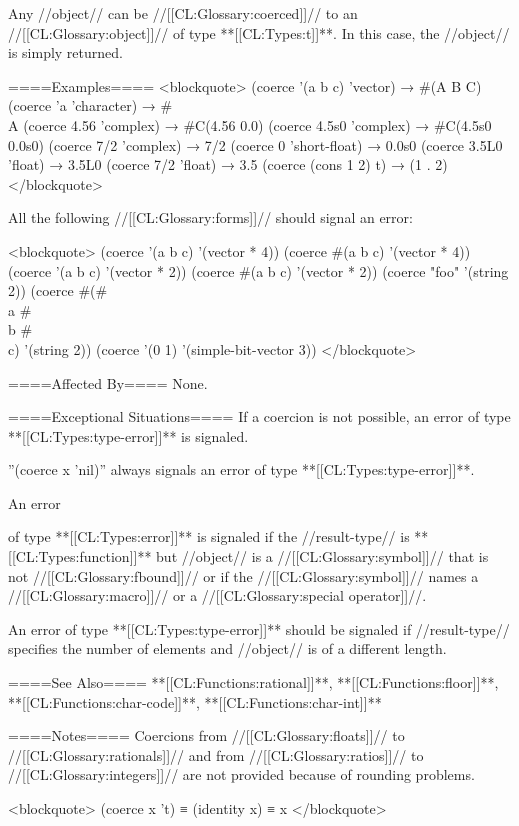 \itemitem{**[[CL:Types:t]]**}

Any //object// can be //[[CL:Glossary:coerced]]// to an //[[CL:Glossary:object]]// of type **[[CL:Types:t]]**. In this case, the //object// is simply returned.

\endlist

====Examples====
<blockquote> (coerce '(a b c) 'vector) → #(A B C) (coerce 'a 'character) → #\\A (coerce 4.56 'complex) → #C(4.56 0.0) (coerce 4.5s0 'complex) → #C(4.5s0 0.0s0) (coerce 7/2 'complex) → 7/2 (coerce 0 'short-float) → 0.0s0 (coerce 3.5L0 'float) → 3.5L0 (coerce 7/2 'float) → 3.5 (coerce (cons 1 2) t) → (1 . 2) </blockquote>

All the following //[[CL:Glossary:forms]]// should signal an error:

<blockquote> (coerce '(a b c) '(vector * 4)) (coerce #(a b c) '(vector * 4)) (coerce '(a b c) '(vector * 2)) (coerce #(a b c) '(vector * 2)) (coerce "foo" '(string 2)) (coerce #(#\\a #\\b #\\c) '(string 2)) (coerce '(0 1) '(simple-bit-vector 3)) </blockquote>

====Affected By====
None.

====Exceptional Situations====
If a coercion is not possible, an error of type **[[CL:Types:type-error]]** is signaled.

''(coerce x 'nil)'' always signals an error of type **[[CL:Types:type-error]]**.

An error

of type **[[CL:Types:error]]** is signaled if the //result-type// is **[[CL:Types:function]]** but //object// is a //[[CL:Glossary:symbol]]// that is not //[[CL:Glossary:fbound]]// or if the //[[CL:Glossary:symbol]]// names a //[[CL:Glossary:macro]]// or a //[[CL:Glossary:special operator]]//.

An error of type **[[CL:Types:type-error]]** should be signaled if //result-type// specifies the number of elements and //object// is of a different length.

====See Also====
**[[CL:Functions:rational]]**, **[[CL:Functions:floor]]**, **[[CL:Functions:char-code]]**, **[[CL:Functions:char-int]]**

====Notes====
Coercions from //[[CL:Glossary:floats]]// to //[[CL:Glossary:rationals]]// and from //[[CL:Glossary:ratios]]// to //[[CL:Glossary:integers]]// are not provided because of rounding problems.

<blockquote> (coerce x 't) ≡ (identity x) ≡ x </blockquote>

      
